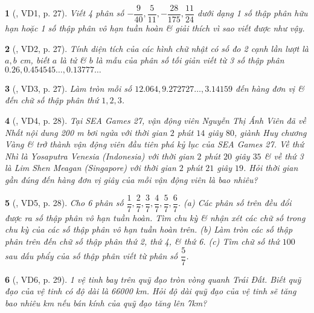 \documentclass{article}
\newtheorem{baitoan}{}
\begin{document}
\begin{baitoan}[\cite{Binh_boi_duong_Toan_7_tap_1}, VD1, p. 27]
	Viết 4 phân số $-\dfrac{9}{40},\dfrac{5}{11},-\dfrac{28}{175},\dfrac{11}{24}$ dưới dạng 1 số thập phân hữu hạn hoặc 1 số thập phân vô hạn tuần hoàn \& giải thích vì sao viết được như vậy.
\end{baitoan}

\begin{baitoan}[\cite{Binh_boi_duong_Toan_7_tap_1}, VD2, p. 27]
	Tính diện tích của các hình chữ nhật có số đo 2 cạnh lần lượt là $a,b$ {\rm cm}, biết $a$ là tử \& $b$ là mẫu của {\rm phân số tối giản} viết từ 3 số thập phân $0.26,0.454545\ldots,0.13777\ldots$
\end{baitoan}

\begin{baitoan}[\cite{Binh_boi_duong_Toan_7_tap_1}, VD3, p. 27]
	Làm tròn mỗi số $12.064,9.272727\ldots,3.14159$ đến hàng đơn vị \& đến chữ số thập phân thứ $1,2,3$.
\end{baitoan}

\begin{baitoan}[\cite{Binh_boi_duong_Toan_7_tap_1}, VD4, p. 28]
	Tại SEA Games 27, vận động viên Nguyễn Thị Ánh Viên đã về Nhất nội dung {\rm200 m} bơi ngửa với thời gian $2$ phút $14$ giây $80$, giành Huy chương Vàng \& trở thành vận động viên đầu tiên phá kỷ lục của SEA Games 27. Về thứ Nhì là Yosaputra Venesia (Indonesia) với thời gian $2$ phút $20$ giây $35$ \& về thứ 3 là Lim Shen Meagan (Singapore) với thời gian $2$ phút $21$ giây $19$. Hỏi thời gian gần đúng đến hàng đơn vị giây của mỗi vận động viên là bao nhiêu?
\end{baitoan}

\begin{baitoan}[\cite{Binh_boi_duong_Toan_7_tap_1}, VD5, p. 28]
	Cho 6 phân số $\dfrac{1}{7},\dfrac{2}{7},\dfrac{3}{7},\dfrac{4}{7},\dfrac{5}{7},\dfrac{6}{7}$. (a) Các phân số trên đều đổi được ra số thập phân vô hạn tuần hoàn. Tìm chu kỳ \& nhận xét các chữ số trong chu kỳ của các số thập phân vô hạn tuần hoàn trên. (b) Làm tròn các số thập phân trên đến chữ số thập phân thứ 2, thứ 4, \& thứ 6. (c) Tìm chữ số thứ $100$ sau dấu phẩy của số thập phân viết từ phân số $\dfrac{5}{7}$.
\end{baitoan}

\begin{baitoan}[\cite{Binh_boi_duong_Toan_7_tap_1}, VD6, p. 29]
	1 vệ tinh bay trên quỹ đạo tròn vòng quanh Trái Đất. Biết quỹ đạo của vệ tinh có độ dài là {\rm66000 km}. Hỏi độ dài quỹ đạo của vệ tinh sẽ tăng bao nhiêu {\rm km} nếu bán kính của quỹ đạo tăng lên {\rm7km}? 
\end{baitoan}
\end{document}
